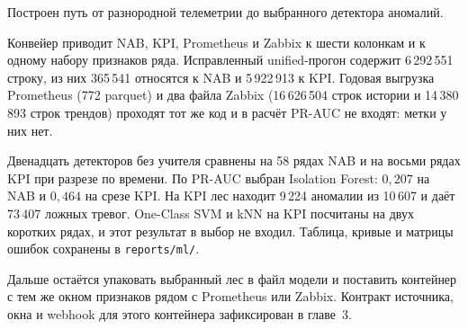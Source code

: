 Построен путь от разнородной телеметрии до выбранного детектора аномалий.

Конвейер приводит NAB, KPI, Prometheus и Zabbix к шести колонкам и к одному набору признаков ряда.
Исправленный unified-прогон содержит 6\,292\,551 строку, из них 365\,541 относятся к NAB и 5\,922\,913 к KPI.
Годовая выгрузка Prometheus (772 parquet) и два файла Zabbix (16\,626\,504 строк истории и 14\,380\,893 строк трендов) проходят тот же код и в расчёт PR-AUC не входят: метки у них нет.

Двенадцать детекторов без учителя сравнены на 58 рядах NAB и на восьми рядах KPI при разрезе по времени.
По PR-AUC выбран Isolation Forest: \(0{,}207\) на NAB и \(0{,}464\) на срезе KPI.
На KPI лес находит 9\,224 аномалии из 10\,607 и даёт 73\,407 ложных тревог.
One-Class SVM и kNN на KPI посчитаны на двух коротких рядах, и этот результат в выбор не входил.
Таблица, кривые и матрицы ошибок сохранены в \texttt{reports/ml/}.

Дальше остаётся упаковать выбранный лес в файл модели и поставить контейнер с тем же окном признаков рядом с Prometheus или Zabbix.
Контракт источника, окна и webhook для этого контейнера зафиксирован в главе~3.
